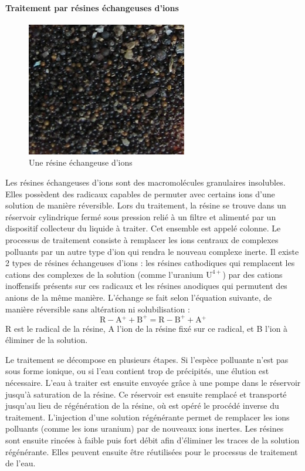 \documentclass{article}
\begin{document}
\paragraph{Traitement par résines échangeuses d’ions} \hspace{1 em}


\begin{figure}[H]
\centering
\includegraphics[]{III_A_2.png}
\caption{Une résine échangeuse d'ions}
\label{fig:resine_echangeuse_ions}
\end{figure}

Les résines échangeuses d’ions sont des macromolécules granulaires insolubles. Elles possèdent des radicaux capables de permuter avec certains ions d’une solution de manière réversible. Lors du traitement, la résine se trouve dans un réservoir cylindrique fermé sous pression relié à un filtre et alimenté par un dispositif collecteur du liquide à traiter. Cet ensemble est appelé colonne. Le processus de traitement consiste à remplacer les ions centraux de complexes polluants par un autre type d’ion qui rendra le nouveau complexe inerte. Il existe 2 types de résines échangeuses d’ions : les résines cathodiques qui remplacent les cations des complexes de la solution (comme l’uranium $\text{U}^{4+}$) par des cations inoffensifs présents sur ces radicaux et les résines anodiques qui permutent des anions de la même manière. L’échange se fait selon l’équation suivante, de manière réversible sans altération ni solubilisation :
$$\text{R}\!-\!\text{A}\!^+\! + \text{B}^+ = \text{R}\!-\!\text{B}^+\! + \text{A}\!^+$$
R est le radical de la résine, A l’ion de la résine fixé sur ce radical, et B l’ion à éliminer de la solution.

Le traitement se décompose en plusieurs étapes. Si l’espèce polluante n’est pas sous forme ionique, ou si l’eau contient trop de précipités, une élution est nécessaire. L’eau à traiter est ensuite envoyée grâce à une pompe dans le réservoir jusqu’à saturation de la résine. Ce réservoir est ensuite remplacé et transporté jusqu’au lieu de régénération de la résine, où est opéré le procédé inverse du traitement. L’injection d’une solution régénérante permet de remplacer les ions polluants (comme les ions uranium) par de nouveaux ions inertes. Les résines sont ensuite rincées à faible puis fort débit afin d’éliminer les traces de la solution régénérante. Elles peuvent ensuite être réutilisées pour le processus de traitement de l’eau.
\end{document}
